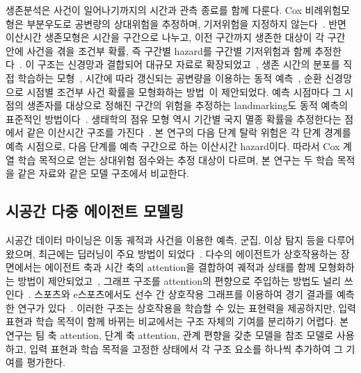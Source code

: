 생존분석은 사건이 일어나기까지의 시간과 관측 종료를 함께 다룬다.
Cox 비례위험모형은 부분우도로 공변량의 상대위험을 추정하며, 기저위험을 지정하지 않는다~\cite{Cox72}.
반면 이산시간 생존모형은 시간을 구간으로 나누고, 이전 구간까지 생존한 대상이 각 구간 안에 사건을 겪을 조건부 확률, 즉 구간별 hazard를 구간별 기저위험과 함께 추정한다~\cite{SingerWillett93}.
이 구조는 신경망과 결합되어 대규모 자료로 확장되었고~\cite{Gensheimer19}, 생존 시간의 분포를 직접 학습하는 모형~\cite{Lee18}, 시간에 따라 갱신되는 공변량을 이용하는 동적 예측~\cite{Lee20}, 순환 신경망으로 시점별 조건부 사건 확률을 모형화하는 방법~\cite{Ren19}이 제안되었다.
예측 시점마다 그 시점의 생존자를 대상으로 정해진 구간의 위험을 추정하는 landmarking도 동적 예측의 표준적인 방법이다~\cite{vanHouwelingen07}.
생태학의 점유 모형 역시 기간별 국지 멸종 확률을 추정한다는 점에서 같은 이산시간 구조를 가진다~\cite{MacKenzie03}.
본 연구의 다음 단계 탈락 위험은 각 단계 경계를 예측 시점으로, 다음 단계를 예측 구간으로 하는 이산시간 hazard이다.
따라서 Cox 계열 학습 목적으로 얻는 상대위험 점수와는 추정 대상이 다르며, 본 연구는 두 학습 목적을 같은 자료와 같은 모델 구조에서 비교한다.

\subsection{시공간 다중 에이전트 모델링}
\label{sec:related:multiagent}

시공간 데이터 마이닝은 이동 궤적과 사건을 이용한 예측, 군집, 이상 탐지 등을 다루어 왔으며, 최근에는 딥러닝이 주요 방법이 되었다~\cite{Atluri18,Wang22}.
다수의 에이전트가 상호작용하는 장면에서는 에이전트 축과 시간 축의 attention을 결합하여 궤적과 상태를 함께 모형화하는 방법이 제안되었고~\cite{Ngiam22,Capellera24}, 그래프 구조를 attention의 편향으로 주입하는 방법도 널리 쓰인다~\cite{Ying21}.
스포츠와 e스포츠에서도 선수 간 상호작용 그래프를 이용하여 경기 결과를 예측한 연구가 있다~\cite{Xenopoulos21}.
이러한 구조는 상호작용을 학습할 수 있는 표현력을 제공하지만, 입력 표현과 학습 목적이 함께 바뀌는 비교에서는 구조 자체의 기여를 분리하기 어렵다.
본 연구는 팀 축 attention, 단계 축 attention, 관계 편향을 갖춘 모델을 참조 모델로 사용하고, 입력 표현과 학습 목적을 고정한 상태에서 각 구조 요소를 하나씩 추가하여 그 기여를 평가한다.
